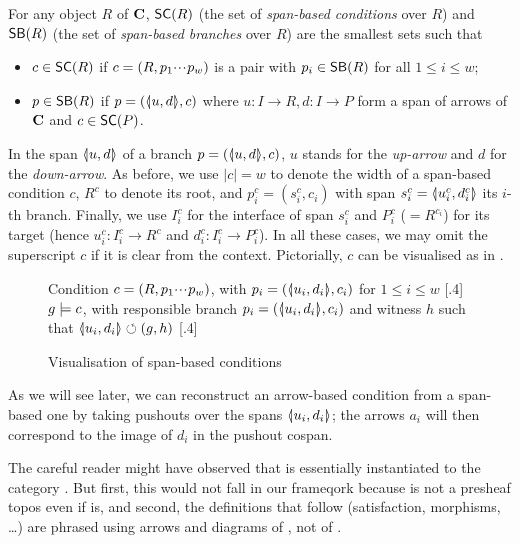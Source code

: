\begin{definition}
  For any object $R$ of $\mathbf{C}$, $\SC R$ (the set of \emph{span-based conditions} over $R$) and $\SB R$ (the set of \emph{span-based branches} over $R$) are the smallest sets such that
  \begin{itemize}
  \item $c\in \SC R$ if $c=(R,p_1{\cdotp\mkern-2mu\cdotp\mkern-2mu\cdotp\mkern1mu} p_w)$ is a pair with $p_i\in \SB R$ for all $1\leq i\leq w$;
  \item $p\in \SB R$ if $p=(\spanof u d,c)$ where $u: I\to R, d:I\to P$ form a span of arrows of $\mathbf{C}$ and $c\in \SC P$.
  \end{itemize}
\end{definition}
%
In the span $\spanof u d$ of a branch $p=(\spanof u d,c)$, $u$ stands for the \emph{up-arrow} and $d$ for the \emph{down-arrow}. As before, we use $|c|=w$ to denote the width of a span-based condition $c$, $R^c$ to denote its root, and $p^c_i=(s^c_i,c_i)$ with span $s^c_i=\spanof{u^c_i}{d^c_i}$ its $i$-th branch. Finally, we use $I^c_i$ for the interface of span $s^c_i$ and $P^c_i$ ($=R^{c_i}$) for its target (hence $u^c_i:I^c_i\to R^c$ and $d^c_i:I^c_i\rightarrow P^c_i$). In all these cases, we may omit the superscript $c$ if it is clear from the context. Pictorially, $c$ can be visualised as in .
%
\begin{figure}
\centering
\subcaptionbox
  {Condition $c=(R,p_1{\cdotp\mkern-2mu\cdotp\mkern-2mu\cdotp\mkern1mu} p_w)$, with $p_i=(\spanof{u_i}{d_i},c_i)$ for $1\leq i\leq w$
   }
  [.4\textwidth]
  {}
\qquad
\subcaptionbox
  {$g\models c$, with responsible branch $p_i=(\spanof{u_i}{d_i},c_i)$ and witness $h$ such that $\spanof{u_i}{d_i}\commutes (g,h)$
   }
  [.4\textwidth]
  {}
\caption{Visualisation of span-based conditions}
\end{figure}
%
As we will see later, we can reconstruct an arrow-based condition from a span-based one by taking pushouts over the spans $\spanof{u_i}{d_i}$; the arrows $a_i$ will then correspond to the image of $d_i$ in the pushout cospan.

\medskip\noindent The careful reader might have observed that  is essentially  instantiated to the category \SpanC. But first, this would not fall in our frameqork because \SpanC is not a presheaf topos even if  is, and second, the definitions that follow (satisfaction, morphisms, \ldots) are phrased using arrows and diagrams of , not of \SpanC.

